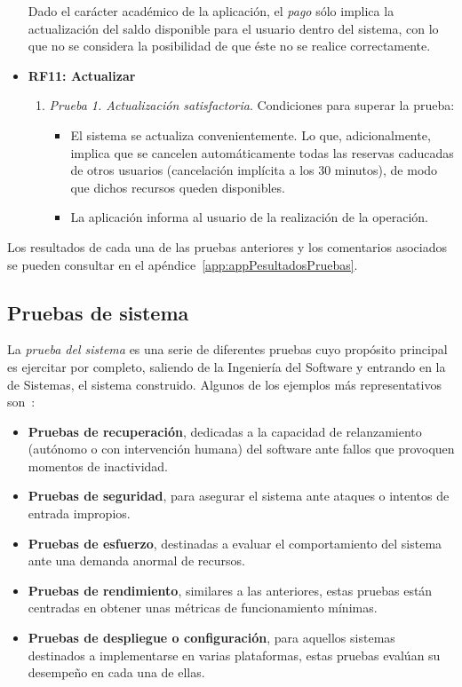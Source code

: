 \begin{itemize}
	Dado el carácter académico de la aplicación, el \emph{pago} sólo implica la actualización del saldo disponible para el usuario dentro del sistema, con lo que no se considera la posibilidad de que éste no se realice correctamente.
		
	\item \textbf{RF11: Actualizar}
	\begin{enumerate}
		\item \textit{Prueba 1. Actualización satisfactoria}. Condiciones para superar la prueba:
		\begin{itemize}
			\item El sistema se actualiza convenientemente. Lo que, adicionalmente, implica que se cancelen automáticamente todas las reservas caducadas de otros usuarios (cancelación implícita a los 30 minutos), de modo que dichos recursos queden disponibles.
			\item La aplicación informa al usuario de la realización de la operación.
		\end{itemize}
	\end{enumerate}
\end{itemize}

Los resultados de cada una de las pruebas anteriores y los comentarios asociados se pueden consultar en el apéndice~\ref{app:appPesultadosPruebas}.

\subsection{Pruebas de sistema}

La \emph{prueba del sistema} es una serie de diferentes pruebas cuyo propósito principal es ejercitar por completo, saliendo de la Ingeniería del Software y entrando en la de Sistemas, el sistema construido. Algunos de los ejemplos más representativos son~\cite{Pre10}:

\begin{itemize}
	\item \textbf{Pruebas de recuperación}, dedicadas a la capacidad de relanzamiento (autónomo o con intervención humana) del software ante fallos que provoquen momentos de inactividad.
	\item \textbf{Pruebas de seguridad}, para asegurar el sistema ante ataques o intentos de entrada impropios.
	\item \textbf{Pruebas de esfuerzo}, destinadas a evaluar el comportamiento del sistema ante una demanda anormal de recursos.
	\item \textbf{Pruebas de rendimiento}, similares a las anteriores, estas pruebas están centradas en obtener unas métricas de funcionamiento mínimas.
	\item \textbf{Pruebas de despliegue o configuración}, para aquellos sistemas destinados a implementarse en varias plataformas, estas pruebas evalúan su desempeño en cada una de ellas.
\end{itemize}

